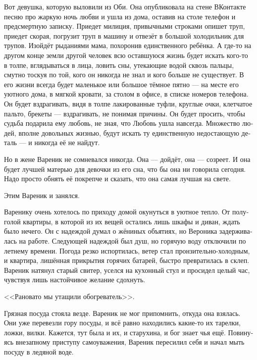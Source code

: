 \documentclass[a5paper,12pt,fleqn]{extbook}\usepackage{cooltooltips}\usepackage{polyglossia}\setdefaultlanguage[babelshorthands=true]{russian}\setotherlanguage{english}\defaultfontfeatures{Ligatures=TeX,Mapping=tex-text} \usepackage{xcolor}\definecolor{lightgray}{HTML}{bbbbbb}\color{lightgray}\newcommand{\ml}[3]{\textenglish{\textcolor{black}{#3}}}
\newcommand{\asterism}{\vspace{1em}{\centering\Large\bfseries$\ast~\ast~\ast$\par}\vspace{1em}}
\newcommand{\textspace}{\vspace{1em}{\centering\Large\bfseries<...>\par}\vspace{1em}}
\begin{document}
Вот девушка, которую выловили из Оби.
Она опубликовала на стене ВКонтакте песню про жаркую ночь любви и ушла из дома, оставив на столе телефон и предсмертную записку.
Приедет милиция, привычными строками опишет труп, приедет скорая, погрузит труп в машину и отвезёт в большой холодильник для трупов.
Изойдёт рыданиями мама, похоронив единственного ребёнка.
А где-то на другом конце земли другой человек всю оставшуюся жизнь будет искать кого-то в толпе, вглядываться в лица, ловить сны, утекающие водой сквозь пальцы, смутно тоскуя по той, кого он никогда не знал и кого больше не существует.
В его жизни всегда будет маленькое или большое тёмное пятно --- на месте его уютного дома, в мягкой кровати, за столом в офисе, в списке номеров телефона.
Он будет вздрагивать, видя в толпе лакированные туфли, круглые очки, клетчатое пальто, брекеты --- вздрагивать, не понимая причины.
Он будет просить, чтобы судьба подарила ему любовь, не зная, что Любовь ушла навсегда.
Множество людей, вполне довольных жизнью, будут искать ту единственную недостающую деталь --- и никогда её не найдут.

Но в жене Вареник не сомневался никогда.
Она --- дойдёт, она --- созреет.
И она будет лучшей матерью для девочки из его сна, что бы она ни говорила сегодня.
Надо просто обнять её покрепче и сказать, что она самая лучшая на свете.

Этим Вареник и занялся.

\asterism

\textspace

Варенику очень хотелось по приходу домой окунуться в уютное тепло.
От полуголой квартиры, в которой из их вещей остались лишь шкафы и диван, ждать было нечего.
Он с надеждой думал о жёниных объятиях, но Вероника задерживалась на работе.
Следующей надеждой был душ, но горячую воду отключили по летнему времени.
Погода резко испортилась, ветер стал пронзительно-холодным, и квартира, лишённая прикрытия горячих батарей, быстро превратилась в склеп.
Вареник натянул старый свитер, уселся на кухонный стул и просидел целый час, чувствуя лишь настойчивое желание сдохнуть.

<<Рановато мы утащили обогреватель>>.

Грязная посуда стояла везде.
Вареник не мог припомнить, откуда она взялась.
Они уже перевезли гору посуды, и всё равно находились какие-то их тарелки, ложки, вилки.
Кажется, тут была и их, и старухина, и бог знает чья ещё.
Повинуясь внезапному приступу самоуважения, Вареник пересилил себя и начал мыть посуду в ледяной воде.
\end{document}
